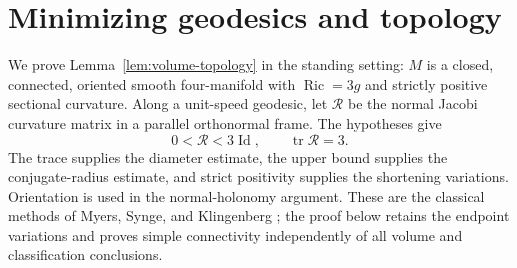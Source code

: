 \section{Minimizing geodesics and topology}
\label{app:topology}

We prove Lemma~\ref{lem:volume-topology} in the standing setting:
$M$ is a closed, connected, oriented smooth four-manifold with
$\operatorname{Ric}=3g$ and strictly positive sectional curvature.
Along a unit-speed geodesic, let $\mathcal R$ be the normal Jacobi
curvature matrix in a parallel orthonormal frame. The hypotheses give
\[
 0<\mathcal R<3\operatorname{Id},\qquad
 \operatorname{tr}\mathcal R=3.
\]
The trace supplies the diameter estimate, the upper bound supplies the
conjugate-radius estimate, and strict positivity supplies the shortening
variations. Orientation is used in the normal-holonomy argument. These
are the classical methods of Myers, Synge, and Klingenberg
\cite{Myers1941,Synge1936,Klingenberg1959}; the proof below retains the
endpoint variations and proves simple connectivity independently of
all volume and classification conclusions.

